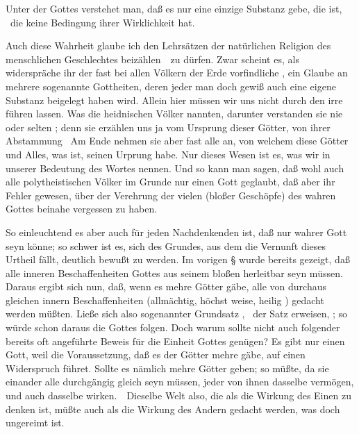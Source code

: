 \begin{aufza}
\item Unter der  Gottes verstehet man, daß es nur eine einzige Substanz gebe, die  ist, \dh\ die keine Bedingung ihrer Wirklichkeit hat.
\item Auch diese Wahrheit glaube ich den Lehrsätzen der natürlichen Religion des menschlichen Geschlechtes beizählen~\ zu dürfen. Zwar scheint es, als widerspräche ihr der fast bei allen Völkern der Erde vorfindliche , ein Glaube an mehrere sogenannte Gottheiten, deren jeder man doch gewiß auch eine eigene Substanz beigelegt haben wird. Allein hier müssen wir uns nicht durch den  irre führen lassen. Was die heidnischen Völker  nannten, darunter verstanden sie nie oder selten ; denn sie erzählen uns ja vom Ursprung dieser Götter, von ihrer Abstammung \usw\ Am Ende nehmen sie aber fast alle  an, von welchem diese Götter und Alles, was ist, seinen Urprung habe. Nur dieses Wesen ist es, was wir in unserer Bedeutung des Wortes  nennen. Und so kann man sagen, daß wohl auch alle polytheistischen Völker im Grunde nur einen  Gott geglaubt, daß aber ihr Fehler gewesen, über der Verehrung der vielen  (bloßer Geschöpfe) des wahren Gottes beinahe vergessen zu haben.
\item So einleuchtend es aber auch für jeden Nachdenkenden ist, daß nur  wahrer Gott seyn könne; so schwer ist es, sich des Grundes, aus dem die Vernunft dieses Urtheil fällt, deutlich bewußt zu werden. Im vorigen § wurde bereits gezeigt, daß alle inneren Beschaffenheiten Gottes aus seinem bloßen  herleitbar seyn müssen. Daraus ergibt sich nun, daß, wenn es mehre Götter gäbe, alle von durchaus gleichen innern Beschaffenheiten (allmächtig, höchst weise, heilig \usw ) gedacht werden müßten. Ließe sich also  sogenannter Grundsatz , \dh\ der Satz erweisen, ; so würde schon daraus die  Gottes folgen. Doch warum sollte nicht auch folgender bereits oft angeführte Beweis für die Einheit Gottes genügen? Es gibt nur einen Gott, weil die Voraussetzung, daß es der Götter mehre gäbe, auf einen Widerspruch führet. Sollte es nämlich mehre Götter geben; so müßte, da sie einander alle durchgängig gleich seyn müssen, jeder von ihnen dasselbe vermögen, und auch dasselbe wirken.~\ Dieselbe Welt also, die als die Wirkung des Einen zu denken ist, müßte auch als die Wirkung des Andern gedacht werden, was doch ungereimt ist.
\end{aufza}

